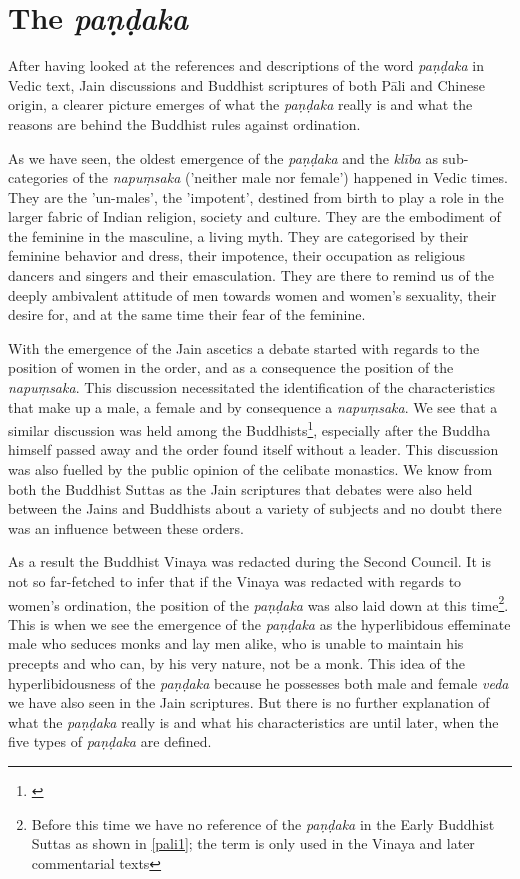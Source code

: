 \section{The {\em paṇḍaka}}

After having looked at the references and descriptions of the word {\em paṇḍaka} in Vedic text, Jain discussions and Buddhist scriptures of both Pāli and Chinese origin, a clearer picture emerges of what the {\em paṇḍaka} really is and what the reasons are behind the Buddhist rules against ordination.

As we have seen, the oldest emergence of the {\em paṇḍaka} and the {\em klība} as sub-categories of the {\em napuṃsaka} ('neither male nor female') happened in Vedic times. They are the 'un-males', the 'impotent', destined from birth to play a role in the larger fabric of Indian religion, society and culture. They are the embodiment of the feminine in the masculine, a living myth. They are categorised by their feminine behavior and dress, their impotence, their occupation as religious dancers and singers and their emasculation. They are there to remind us of the deeply ambivalent attitude of men towards women and women's sexuality, their desire for, and at the same time their fear of the feminine.

With the emergence of the Jain ascetics a debate started with regards to the position of women in the order, and as a consequence the position of the {\em napuṃsaka}. This discussion necessitated the identification of the characteristics that make up a male, a female and by consequence a {\em napuṃsaka}. We see that a similar discussion was held among the Buddhists\footnote{\cite{sujato2009}}, especially after the Buddha himself passed away and the order found itself without a leader. This discussion was also fuelled by the public opinion of the celibate monastics. We know from both the Buddhist Suttas as the Jain scriptures that debates were also held between the Jains and Buddhists about a variety of subjects and no doubt there was an influence between these orders.

As a result the Buddhist Vinaya was redacted during the Second Council. It is not so far-fetched to infer that if the Vinaya was redacted with regards to women's ordination, the position of the {\em paṇḍaka} was also laid down at this time\footnote{Before this time we have no reference of the {\em paṇḍaka} in the Early Buddhist Suttas as shown in \ref{pali1}; the term is only used in the Vinaya and later commentarial texts}. This is when we see the emergence of the {\em paṇḍaka} as the hyperlibidous effeminate male who seduces monks and lay men alike, who is unable to maintain his precepts and who can, by his very nature, not be a monk. This idea of the hyperlibidousness of the {\em paṇḍaka} because he possesses both male and female {\em veda} we have also seen in the Jain scriptures. But there is no further explanation of what the {\em paṇḍaka} really is and what his characteristics are until later, when the five types of {\em paṇḍaka} are defined. 


